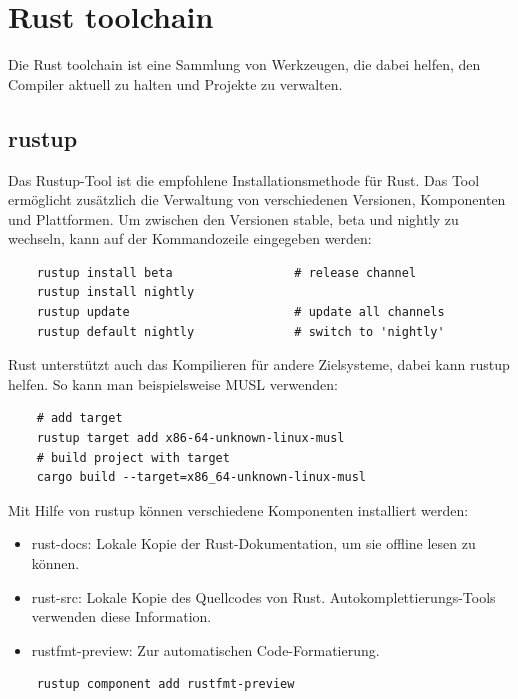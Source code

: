 \chapter{Rust toolchain}

Die Rust toolchain ist eine Sammlung von Werkzeugen, die dabei helfen, den Compiler aktuell zu halten und Projekte zu verwalten.


\section{rustup}

Das Rustup-Tool ist die empfohlene Installationsmethode für Rust. Das Tool ermöglicht zusätzlich die Verwaltung von verschiedenen Versionen, Komponenten und Platt\-for\-men. Um zwischen den Versionen stable, beta und nightly zu wechseln, kann auf der Kommandozeile eingegeben werden: \cite{RustEdition}

\begin{lstlisting}   
    rustup install beta                 # release channel
    rustup install nightly
    rustup update                       # update all channels
    rustup default nightly              # switch to 'nightly'
\end{lstlisting}

Rust unterstützt auch das Kompilieren für andere Zielsysteme, dabei kann rustup helfen. So kann man beispielsweise MUSL verwenden:

\begin{lstlisting}
    # add target
    rustup target add x86-64-unknown-linux-musl
    # build project with target
    cargo build --target=x86_64-unknown-linux-musl
\end{lstlisting}

Mit Hilfe von rustup können verschiedene Komponenten installiert werden:

\begin{itemize}
    \item rust-docs: Lokale Kopie der Rust-Dokumentation, um sie offline lesen zu können.
    \item rust-src: Lokale Kopie des Quellcodes von Rust. Autokomplettierungs-Tools verwenden diese Information.
    \item rustfmt-preview: Zur automatischen Code-Formatierung.
\end{itemize}

\begin{lstlisting}
    rustup component add rustfmt-preview
\end{lstlisting}


